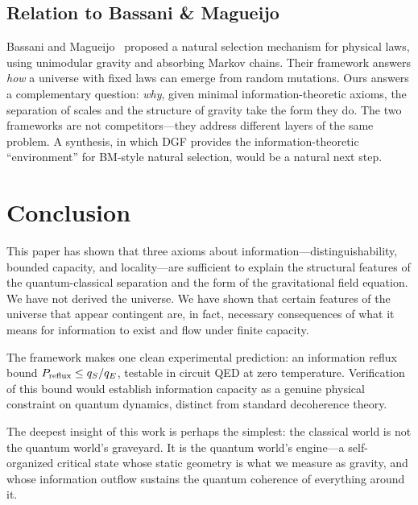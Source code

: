\documentclass[reprint]{revtex4-2}
\begin{document}
\subsection{Relation to Bassani \& Magueijo}

Bassani and Magueijo~\cite{Bassani2025} proposed a natural selection mechanism for physical laws, using unimodular gravity and absorbing Markov chains. Their framework answers \emph{how} a universe with fixed laws can emerge from random mutations. Ours answers a complementary question: \emph{why}, given minimal information-theoretic axioms, the separation of scales and the structure of gravity take the form they do. The two frameworks are not competitors---they address different layers of the same problem. A synthesis, in which DGF provides the information-theoretic ``environment'' for BM-style natural selection, would be a natural next step.

\section{Conclusion}

This paper has shown that three axioms about information---distinguishability, bounded capacity, and locality---are sufficient to explain the structural features of the quantum-classical separation and the form of the gravitational field equation. We have not derived the universe. We have shown that certain features of the universe that appear contingent are, in fact, necessary consequences of what it means for information to exist and flow under finite capacity.

The framework makes one clean experimental prediction: an information reflux bound $P_{\rm reflux}\le q_S/q_E$, testable in circuit QED at zero temperature. Verification of this bound would establish information capacity as a genuine physical constraint on quantum dynamics, distinct from standard decoherence theory.

The deepest insight of this work is perhaps the simplest: the classical world is not the quantum world's graveyard. It is the quantum world's engine---a self-organized critical state whose static geometry is what we measure as gravity, and whose information outflow sustains the quantum coherence of everything around it.
\end{document}
